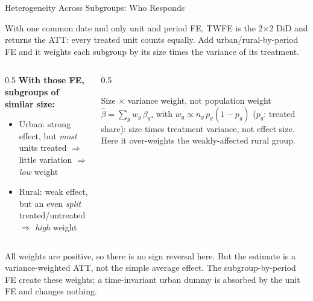 \documentclass[main.tex]{subfiles}
\begin{document}
\begin{frame}{Heterogeneity Across Subgroups: Who Responds}

  With one common date and only unit and period FE, TWFE is the 2$\times$2 DiD and
  returns the ATT: every treated unit counts equally. Add urban/rural-by-period FE
  and it weights each subgroup by its size times the \alert{variance of its treatment}.

  \medskip
  \begin{columns}[T]
    \begin{column}{0.5\textwidth}
      \textbf{With those FE, subgroups of similar size:}
      \begin{itemize}
        \item Urban: \alert{strong} effect, but \emph{most} units treated
          $\Rightarrow$ little variation $\Rightarrow$ \emph{low} weight
        \item Rural: \alert{weak} effect, but an even \emph{split}
          treated/untreated $\Rightarrow$ \emph{high} weight
      \end{itemize}
    \end{column}
    \begin{column}{0.5\textwidth}
      \begin{block}{Size $\times$ variance weight, not population weight}
        $\hat\beta = \sum_g w_g\,\beta_g$, with $w_g \propto n_g\,p_g(1-p_g)$
        ($p_g$: treated share): size times treatment variance, not effect
        size. Here it over-weights the
        weakly-affected rural group.
      \end{block}
    \end{column}
  \end{columns}

  \medskip
  All weights are positive, so there is no sign reversal here. But the estimate is a
  \alert{variance-weighted ATT}, not the simple average effect. The
  subgroup-by-period FE create these weights; a time-invariant urban dummy is
  absorbed by the unit FE and changes nothing.

\end{frame}
\end{document}
